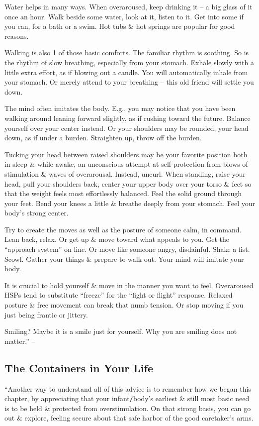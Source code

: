 \documentclass{article}
\numberwithin{equation}{section}
\begin{document}
Water helps in many ways. When overaroused, keep drinking it -- a big glass of it once an hour. Walk beside some water, look at it, listen to it. Get into some if you can, for a bath or a swim. Hot tubs \& hot springs are popular for good reasons.

Walking is also 1 of those basic comforts. The familiar rhythm is soothing. So is the rhythm of slow breathing, especially from your stomach. Exhale slowly with a little extra effort, as if blowing out a candle. You will automatically inhale from your stomach. Or merely attend to your breathing -- this old friend will settle you down.

The mind often imitates the body. E.g., you may notice that you have been walking around leaning forward slightly, as if rushing toward the future. Balance yourself over your center instead. Or your shoulders may be rounded, your head down, as if under a burden. Straighten up, throw off the burden.

Tucking your head between raised shoulders may be your favorite position both in sleep \& while awake, an unconscious attempt at self-protection from blows of stimulation \& waves of overarousal. Instead, uncurl. When standing, raise your head, pull your shoulders back, center your upper body over your torso \& feet so that the weight feels most effortlessly balanced. Feel the solid ground through your feet. Bend your knees a little \& breathe deeply from your stomach. Feel your body's strong center.

Try to create the moves as well as the posture of someone calm, in command. Lean back, relax. Or get up \& move toward what appeals to you. Get the ``approach system'' on line. Or move like someone angry, disdainful. Shake a fist. Scowl. Gather your things \& prepare to walk out. Your mind will imitate your body.

It is crucial to hold yourself \& move in the manner you want to feel. Overaroused HSPs tend to substitute ``freeze'' for the ``fight or flight'' response. Relaxed posture \& free movement can break that numb tension. Or stop moving if you just being frantic or jittery.

Smiling? Maybe it is a smile just for yourself. Why you are smiling does not matter.'' -- \cite[pp. 90--93]{Aron2013}

\subsection{The Containers in Your Life}
``Another way to understand all of this advice is to remember how we began this chapter, by appreciating that your infant{\tt/}body's earliest \& still most basic need is to be held \& protected from overstimulation. On that strong basis, you can go out \& explore, feeling secure about that safe harbor of the good caretaker's arms.
\end{document}
